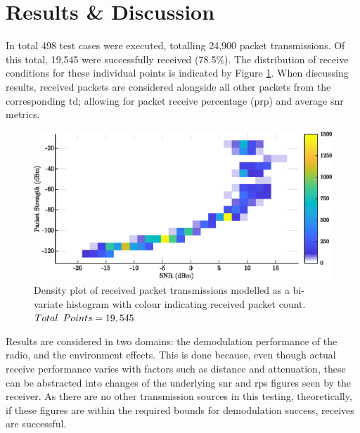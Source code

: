 \section{Results \& Discussion}
In total 498 test cases were executed, totalling 24,900 packet transmissions. Of this total, 19,545 were successfully received (78.5\%). The distribution of receive conditions for these individual points is indicated by Figure \ref{fig:density_plot}. When discussing results, received packets are considered alongside all other packets from the corresponding \ac{td}; allowing for packet receive percentage (\ac{prp}) and average \ac{snr}  metrics.


\begin{figure}[H]
    \centering
   	\includegraphics{Figures/density_plot}
    \caption[Test data distribution plot]{
    Density plot of received packet transmissions modelled as a bi-variate histogram with colour indicating received packet count. \\$Total\enskip Points = 19,545$
    }
    \label{fig:density_plot}
\end{figure}

Results are considered in two domains: the demodulation performance of the radio, and the environment effects. This is done because, even though actual receive performance varies with factors such as distance and attenuation, these can be abstracted into changes of the underlying \ac{snr} and \ac{rps} figures seen by the receiver. As there are no other transmission sources in this testing, theoretically, if these figures are within the required bounds for demodulation success, receives are successful.

